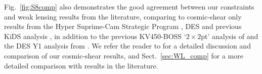 Fig.~\ref{fig:S8comp} also demonstrates the good agreement between our constraints and weak lensing results from the literature, comparing to cosmic-shear only results from the Hyper Suprime-Cam Strategic Program \citep[HSC,][]{hikage/etal:2019,hamana/etal:2020}, DES \citep{troxel/etal:2018} and previous KiDS analysis \citep[KV450][]{hildebrandt/etal:2020}, in addition to the previous KV450-BOSS `$2\times2$pt' analysis of \citet{troester/etal:2020} and the DES Y1 \tttp analysis from \citet{abbott/etal:2018}.   We refer the reader to \citet{asgari/etal:inprep} for a detailed discussion and comparison of our cosmic-shear results, and Sect.~\ref{sec:WL_comp} for a more detailed comparison with \tttp results in the literature.

\begin{figure}
	\begin{center}

\end{center}
\end{figure}
